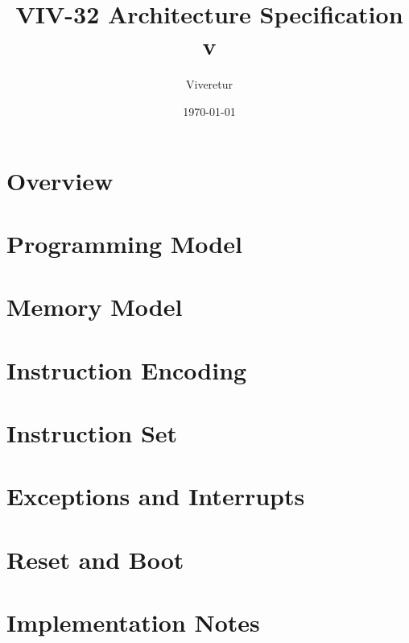 \documentclass[11pt,a4paper]{report}
\title{VIV-32 Architecture Specification v\version}
\author{Viveretur}
\date{\today}
\begin{document}
\maketitle

\tableofcontents
\clearpage

\chapter{Overview}


\chapter{Programming Model}


\chapter{Memory Model}


\chapter{Instruction Encoding}


\chapter{Instruction Set}


\chapter{Exceptions and Interrupts}


\chapter{Reset and Boot}


\chapter{Implementation Notes}

\end{document}
